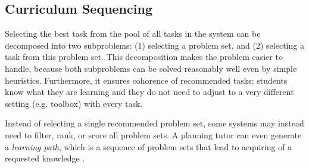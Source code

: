 

\subsection{Curriculum Sequencing}


Selecting the best task from the pool of all tasks in the system
can be decomposed into two subproblems: (1) selecting a problem set,
and (2) selecting a task from this problem set.
This decomposition makes the problem easier to handle, because
both subproblems can be solved reasonably well even by simple heuristics.
Furthermore, it ensures cohorence of recommended tasks;
students know what they are learning and they do not need to adjust to a very
different setting (e.g. toolbox) with every task.

Instead of selecting a single recommended problem set, some systems may
instead need to filter, rank, or score all problem sets.
A planning tutor can even generate a \emph{learning path}, which is a sequence
of problem sets that lead to acquiring of a requested knowledge
\cite{its-programming}.

